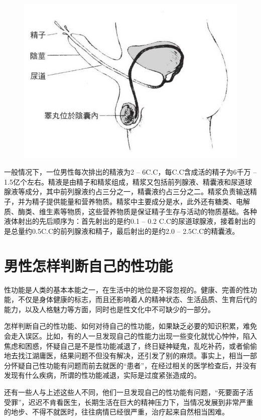 \documentclass[12pt,UTF8]{ctexbook}
\begin{document}
\begin{figure}[htbp]
	\centering
	\includegraphics[width=0.7\linewidth]{5}
	\caption{}
\end{figure}

一般情况下，一位男性每次排出的精液为2 -- 6C.C，每C.C含成活的精子为6千万 -- 1.5亿个左右。精液是由精子和精浆组成，精浆又包括前列腺液、精囊液和尿道球腺液等成分，其中前列腺液约占三分之一，精囊液约占三分之二。精浆负责输送精子，并为精子提供能量和营养物质。精浆中主要成分是水，此外还有糖类、电解质、酶类、维生素等物质，这些营养物质是保证精子生存与活动的物质基础。各种液体射出的先后顺序为：首先射出的是约0.1 -- 0.2 C.C的尿道球腺液，接着射出的是总量约0.5C.C的前列腺液和精子，最后射出的是约2.0 -- 2.5C.C的精囊液。

\section{男性怎样判断自己的性功能}

性功能是人类的基本本能之一，在生活中的地位是不容忽视的。健康、完善的性功能，不仅是身体健康的标志，而且还影响着人的精神状态、生活品质、生育后代的能力，以及人格魅力等方面，同时也是性文化中不可缺少的一部分。

怎样判断自己的性功能、如何对待自己的性功能，如果缺乏必要的知识积累，难免会走入误区。比如，有的人一旦发现自己的性能力出现一些变化就忧心忡忡，陷入焦虑和困惑，怀疑自己是不是性功能减退了，终日疑神疑鬼，乱吃补药，或者偷偷地去找江湖庸医，结果问题不但没有解决，还引发了别的麻烦。事实上，相当一部分怀疑自己性功能有问题而前去就医的“患者”，在经过相关的医学检查后，并没有发现有什么疾病，所谓的性功能减退，实际是过度紧张造成的。

还有一些人与上述这些人不同，他们一旦发现自己的性功能有问题，“死要面子活受罪”，迟迟不肯看医生，长期生活在巨大的精神压力下，当情况发展到非常严重的地步、不得不就医时，往往病情已经很严重，治疗起来自然相当困难。
\end{document}
